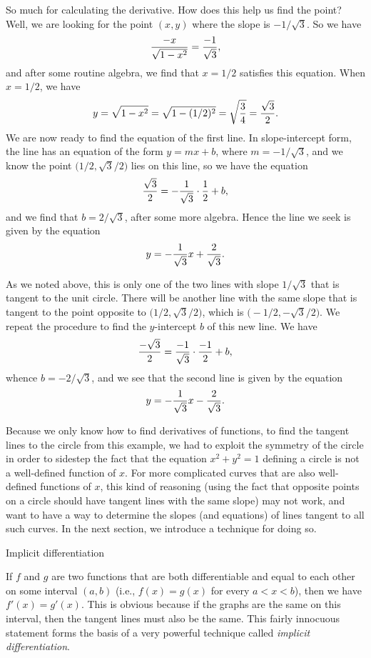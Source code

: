 So much for calculating the derivative. How does this help us find the point? Well, we are looking for
the point $(x,y)$ where the slope is $-1/\sqrt 3$. So we have
$${-x\over \sqrt{1-x^2}} = {-1\over \sqrt 3},$$
and after some routine algebra, we find that $x=1/2$ satisfies this equation. When $x=1/2$, we have
$$y = \sqrt{1-x^2} = \sqrt{1-(1/2)^2} = \sqrt{3\over 4} = {\sqrt 3\over 2}.$$
We are now ready to find the equation of the first line. In slope-intercept form, the line has an equation
of the form $y=mx+b$, where $m={-1/\sqrt 3}$, and we know the point $\bigl(1/2, \sqrt 3/2\bigr)$ lies on
this line, so we have the equation
$$ {\sqrt 3\over 2} = -{1\over \sqrt 3}\cdot {1\over 2} + b,$$
and we find that $b=2/\sqrt 3$, after some more algebra. Hence the line we seek is given by the equation
$$y = -{1\over \sqrt 3} x + {2\over \sqrt 3}.$$

As we noted above, this is only one of the two lines with slope $1/\sqrt 3$ that is tangent to the unit
circle. There will be another line with the same slope that is tangent to the point opposite to
$\bigl( 1/2, \sqrt 3/2\bigr)$, which is $\bigl(-1/2, -\sqrt 3/2)$. We repeat the procedure to find
the $y$-intercept $b$ of this new line. We have
$${-\sqrt 3\over 2} = {-1\over \sqrt 3} \cdot {-1\over 2} + b,$$
whence $b = -2/\sqrt 3$, and we see that the second line is given by the equation
$$y = -{1\over \sqrt 3} x - {2\over \sqrt 3}.$$

Because we only know how to find derivatives of functions, to find the tangent lines to the circle
from this example, we had to exploit the symmetry of the circle in order to sidestep the fact that the
equation $x^2 + y^2 = 1$ defining a
circle is not a well-defined function of $x$.
For more complicated curves that are also well-defined functions of $x$, this kind of reasoning (using the
fact that opposite points on a circle should have tangent lines with the same slope) may not work, and
want to have a way to determine the slopes (and equations)
of lines tangent to all such curves. In the next section, we introduce a technique for doing so.

\advsect Implicit differentiation

If $f$ and $g$ are two functions that are both differentiable and equal to each other
on some interval $(a,b)$ (i.e.,
$f(x) = g(x)$ for every $a<x<b$), then we have $f'(x) = g'(x)$. This is obvious because if the graphs are
the same on this interval, then the tangent lines must also be the same. This fairly innocuous statement
forms the basis of a very powerful technique called {\it implicit differentiation}.

